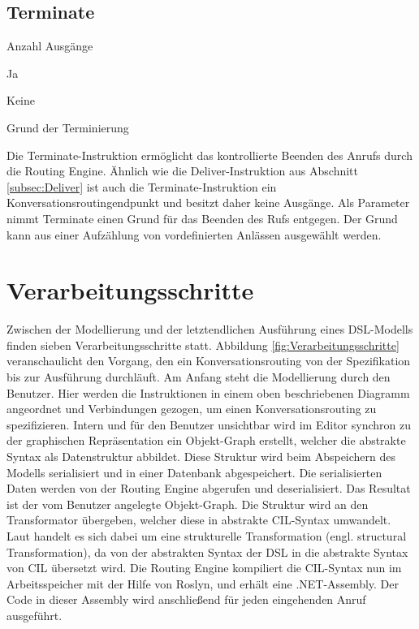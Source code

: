 \subsection{Terminate}
\label{subsec:terminate}
\begin{labeling}{Anzahl Ausgänge}
\item [Eingang] Ja
\item [Anzahl Ausgänge] Keine
\item [Parameter] Grund der Terminierung
\item [Beschreibung] Die Terminate-Instruktion ermöglicht das kontrollierte Beenden des Anrufs durch die Routing Engine. Ähnlich wie die Deliver-Instruktion aus Abschnitt \ref{subsec:Deliver} ist auch die Terminate-Instruktion ein Konversationsroutingendpunkt und besitzt daher keine Ausgänge. Als Parameter nimmt Terminate einen Grund für das Beenden des Rufs entgegen. Der Grund kann aus einer Aufzählung von vordefinierten Anlässen ausgewählt werden.
\end{labeling}



\section{Verarbeitungsschritte}
\label{sec:Verarbeitungsschritte}
Zwischen der Modellierung und der letztendlichen Ausführung eines DSL-Modells finden sieben Verarbeitungsschritte statt. Abbildung \ref{fig:Verarbeitungsschritte} veranschaulicht den Vorgang, den ein Konversationsrouting von der Spezifikation bis zur Ausführung durchläuft. Am Anfang steht die Modellierung durch den Benutzer. Hier werden die Instruktionen in einem oben beschriebenen Diagramm angeordnet und Verbindungen gezogen, um einen Konversationsrouting zu spezifizieren. Intern und für den Benutzer unsichtbar wird im Editor synchron zu der graphischen Repräsentation ein Objekt-Graph erstellt, welcher die abstrakte Syntax als Datenstruktur abbildet. Diese Struktur wird beim Abspeichern des Modells serialisiert und in einer Datenbank abgespeichert. Die serialisierten Daten werden von der Routing Engine abgerufen und deserialisiert. Das Resultat ist der vom Benutzer angelegte Objekt-Graph. Die Struktur wird an den Transformator übergeben, welcher diese in abstrakte CIL-Syntax umwandelt. Laut \cite[S. 72f]{Kleppe:09} handelt es sich dabei um eine strukturelle Transformation (engl. structural Transformation), da von der abstrakten Syntax der DSL in die abstrakte Syntax von CIL übersetzt wird. Die Routing Engine kompiliert die CIL-Syntax nun im Arbeitsspeicher mit der Hilfe von Roslyn, und erhält eine .NET-Assembly. Der Code in dieser Assembly wird anschließend für jeden eingehenden Anruf ausgeführt. 

